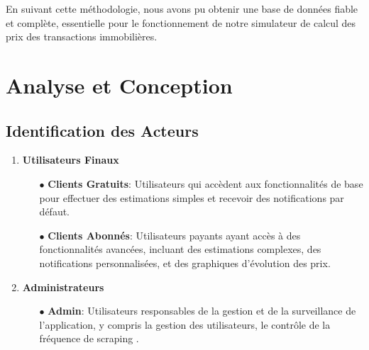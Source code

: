 \documentclass[a4paper,12pt]{report}
\numberwithin{equation}{section}
\begin{document}
\large{
\par En suivant cette méthodologie, nous avons pu obtenir une base de données fiable et complète, essentielle pour le fonctionnement de notre simulateur de calcul des prix des transactions immobilières.\par
}

\newpage
\chapter{Analyse et Conception}
\section{Identification des Acteurs}
\vspace{0.5cm}
\begin{enumerate}
    \item \textbf{Utilisateurs Finaux}
    \begin{itemize}
        \item[$\bullet$] \textbf{Clients Gratuits}: Utilisateurs qui accèdent aux fonctionnalités de base pour effectuer des estimations simples et recevoir des notifications par défaut.
        \item[$\bullet$] \textbf{Clients Abonnés}: Utilisateurs payants ayant accès à des fonctionnalités avancées, incluant des estimations complexes, des notifications personnalisées, et des graphiques d'évolution des prix.
    \end{itemize}
    \item \textbf{Administrateurs}
    \begin{itemize}
        \item[$\bullet$] \textbf{Admin}: Utilisateurs responsables de la gestion et de la surveillance de l'application, y compris la gestion des utilisateurs, le contrôle de la fréquence de scraping .
    \end{itemize}
\end{enumerate}
\end{document}
